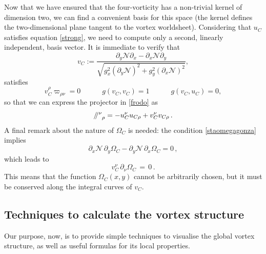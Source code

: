 \documentclass[usenatbib%
]{mnras}
\newcommand{\spc}{\quad \quad \quad}
\newcommand{\paral}{\mathbin{ \, \!/\mkern-5mu/\!} \,}
\begin{document}
Now that we have ensured that the four-vorticity has a non-trivial kernel of dimension two, we can find a convenient basis for this space (the kernel defines the two-dimensional plane   tangent to the vortex worldsheet). Considering that $u_C$ satisfies equation \eqref{strong}, we need to compute only a second, linearly independent, basis vector. 
It is immediate to verify that
\begin{equation}\label{versorino}
v_C := \dfrac{\partial_y \mathcal{N} \partial_x - \partial_x \mathcal{N} \partial_y}{\sqrt{g_x^2 (\partial_y \mathcal{N})^2 + g_y^2 (\partial_x \mathcal{N})^2}},
\end{equation}
satisfies
\begin{equation}\label{nonmolliamomai}
v_C^\rho \varpi_{\rho \nu} =0   \spc g(v_C,v_C)=1  \spc  g(v_C,u_C)=0 ,
\end{equation}
so that we can express the projector in \eqref{frodo} as
\begin{equation}\label{ilparallelosemplice}
\paral\indices{^\nu _\rho} = -u_C^\nu u_{C\rho} + v_C^\nu v_{C\rho} \, .
\end{equation}
A final remark about the nature of $\Omega_C$ is needed: the condition \eqref{staomegagonza} implies
\begin{equation}
\partial_x \mathcal{N} \, \partial_y \Omega_C - \partial_y \mathcal{N} \, \partial_x \Omega_C =0 \, ,
\end{equation}
which leads to  
\begin{equation}\label{scopertona!!!!}
v_C^\nu \, \partial_\nu \Omega_C \, = \, 0 \, .
\end{equation}
This means that the function $\Omega_C(x,y)$ cannot be arbitrarily chosen, but it must be conserved along the integral curves of $v_C$. 



\subsection{Techniques to calculate the vortex structure}\label{profiliedensitingenerale}

Our purpose, now, is to provide simple techniques to visualise the global vortex structure, as well as useful formulas for its local properties. 
\end{document}
